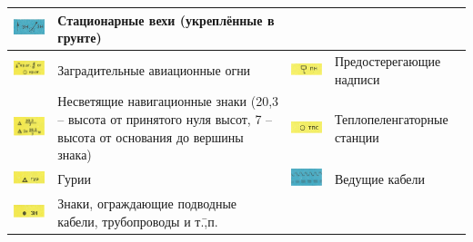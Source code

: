 \documentclass[a4paper, 12pt, twoside, final, book, russian, fittopage, cyremdash]{ncc}
\begin{document}
\begin{longtable}{M|m{0.2\textwidth}|M|m{0.2\textwidth}}
  \includegraphics[scale=1.3]{APP-2-B-18} & Стационарные вехи (укреплённые в грунте) \\
  \midrule
  \includegraphics[scale=1.3]{APP-2-B-13} & Заградительные авиационные огни &
  \includegraphics[scale=1.3]{APP-2-B-19} & Предостерегающие надписи \\
  \midrule
  \includegraphics[scale=1.3]{APP-2-B-14} & Несветящие навигационные знаки (20,3 \--- высота от принятого нуля высот, 7 \--- высота от основания до вершины знака) &
  \includegraphics[scale=1.3]{APP-2-B-20} & Теплопеленгаторные станции \\
  \midrule
  \includegraphics[scale=1.3]{APP-2-B-15} & Гурии &
  \includegraphics[scale=1.3]{APP-2-B-21} & Ведущие кабели \\
  \midrule
  \includegraphics[scale=1.3]{APP-2-B-16} & Знаки, ограждающие подводные кабели, трубопроводы и т.\=,п. &

\end{longtable}
\end{document}
